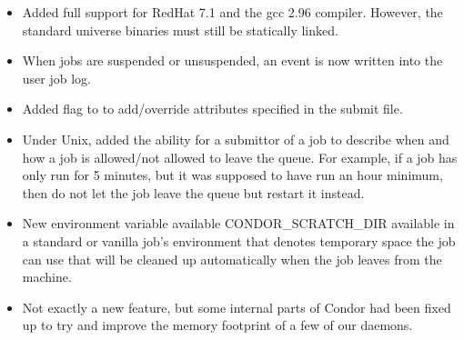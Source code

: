 \begin{itemize}
\item Added full support for RedHat 7.1 and the gcc 2.96 compiler. However,
the standard universe binaries must still be statically linked.

\item When jobs are suspended or unsuspended, an event is now written into
the user job log.

\item Added  flag to  to add/override attributes
specified in the submit file.

\item Under Unix, added the ability for a submittor of a job to describe when
and how a job is allowed/not allowed to leave the queue. For example, if
a job has only run for 5 minutes, but it was supposed to have run an hour 
minimum, then do not let the job leave the queue but restart it instead.

\item New environment variable available CONDOR\_SCRATCH\_DIR available
in a standard or vanilla job's environment that denotes temporary space
the job can use that will be cleaned up automatically when the job leaves
from the machine.

\item Not exactly a new feature, but some internal parts of Condor had been
fixed up to try and improve the memory footprint of a few of our daemons.

\end{itemize}

